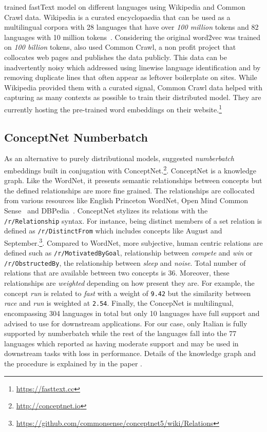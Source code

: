 \textcite{grave_learning_2018} trained fastText model on different languages using Wikipedia and Common Crawl data.
Wikipedia is a curated encyclopaedia that can be used as a multilingual corpora with 28 languages that have over \emph{100 million} tokens and 82 languages with 10 million tokens~\cite{grave_learning_2018}.
Considering the original word2vec was trained on \emph{100 billion} tokens, \citeauthor{grave_learning_2018} also used Common Crawl, a non profit project that collocates web pages and publishes the data publicly.
This data can be inadvertently noisy which \citeauthor{grave_learning_2018} addressed using linewise language identification and by removing duplicate lines that often appear as leftover boilerplate on sites.
While Wikipedia provided them with a curated signal, Common Crawl data helped with capturing as many contexts as possible to train their distributed model.
They are currently hosting the pre-trained word embeddings on their website.\footnote{\url{https://fasttext.cc}}

\subsection{ConceptNet Numberbatch}%
\label{sub:conceptnet_numberbatch}

As an alternative to purely distributional models, \textcite{speer_conceptnet_2017} suggested \emph{numberbatch} embeddings built in conjugation with ConceptNet.\footnote{\url{http://conceptnet.io}}.
ConceptNet is a knowledge graph.
Like the WordNet, it presents semantic relationships between concepts but the defined relationships are more fine grained.
The relationships are collocated from various resources like English Princeton WordNet, Open Mind Common Sense~\cite{anacleto_can_2006} and DBPedia~\cite{auer_dbpedia_2007}.
ConceptNet stylizes its relations with the \texttt{/r/Relationship} syntax.
For instance, being distinct members of a set relation is defined as \texttt{/r/DistinctFrom} which includes concepts like August and September.\footnote{\url{https://github.com/commonsense/conceptnet5/wiki/Relations}}.
Compared to WordNet, more subjective, human centric relations are defined such as \texttt{/r/MotivatedByGoal}, relationship between \emph{compete} and \emph{win} or \texttt{/r/ObstructedBy}, the relationship between \emph{sleep} and \emph{noise}.
Total number of relations that are available between two concepts is 36.
Moreover, these relationships are \emph{weighted} depending on how present they are.
For example, the concept \emph{run} is related to \emph{fast} with a weight of \texttt{9.42} but the similarity between \emph{race} and \emph{run} is weighted at \texttt{2.54}.
Finally, the ConcepNet is multilingual, encompassing 304 languages in total but only 10 languages have full support and advised to use for downstream applications.
For our case, only Italian is fully supported by numberbatch while the rest of the languages fall into the 77 languages which reported as having moderate support and may be used in downstream tasks with loss in performance.
Details of the knowledge graph and the procedure is explained by \textcite{speer_conceptnet_2017} in the paper .

